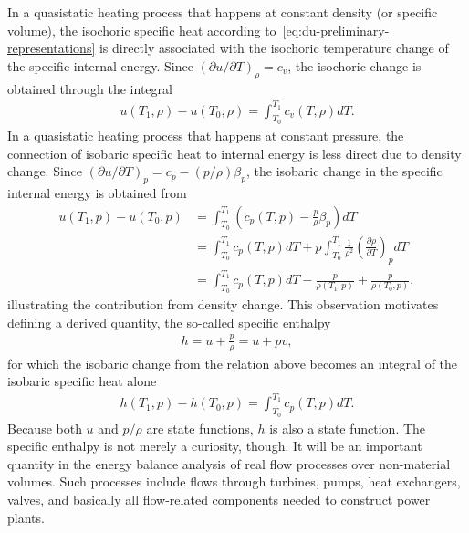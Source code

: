 In a quasistatic heating process that happens at constant density (or specific volume), the isochoric specific heat according to~\eqref{eq:du-preliminary-representations} is directly associated with the isochoric temperature change of the specific internal energy. Since $(\partial u/\partial T)_\rho=c_v$, the isochoric change is obtained through the integral
\begin{align}
    u(T_1,\rho)-u(T_0,\rho)=\int_{T_0}^{T_1}c_v(T,\rho)dT.
\end{align}
In a quasistatic heating process that happens at constant pressure, the connection of isobaric specific heat to internal energy is less direct due to density change. Since $(\partial u/\partial T)_p=c_p-(p/\rho)\beta_p$, the isobaric change in the specific internal energy is obtained from
\begin{align}
    u(T_1,p)-u(T_0,p)&=\int_{T_0}^{T_1}\left(c_p(T,p)-\frac{p}{\rho}\beta_p\right) dT\nonumber\\
    &=\int_{T_0}^{T_1}c_p(T,p)dT+p\int_{T_0}^{T_1}\frac{1}{\rho^2}\left(\frac{\partial \rho}{\partial T}\right)_pdT\nonumber\\
    &=\int_{T_0}^{T_1}c_p(T,p)dT-\frac{p}{\rho(T_1,p)}+\frac{p}{\rho(T_0,p)},
\end{align}
illustrating the contribution from density change. This observation motivates defining a derived quantity, the so-called specific enthalpy 
\begin{align}
    h=u+\frac{p}{\rho}=u+pv,
\end{align}
for which the isobaric change from the relation above becomes an integral of the isobaric specific heat alone
\begin{align}
    h(T_1,p)-h(T_0,p)=\int_{T_0}^{T_1}c_p(T,p)dT.
\end{align}
Because both $u$ and $p/\rho$ are state functions, $h$ is also a state function. The specific enthalpy is not merely a curiosity, though. It will be an important quantity in the energy balance analysis of real flow processes over non-material volumes. Such processes include flows through turbines, pumps, heat exchangers, valves, and basically all flow-related components needed to construct power plants.

